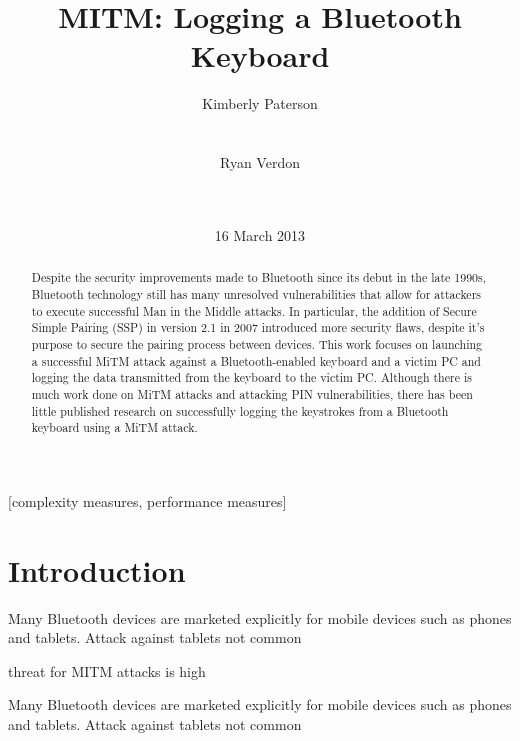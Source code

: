 \documentclass{acm_proc_article-sp}
\begin{document}
\title{MITM: Logging a Bluetooth Keyboard}
\author{
\alignauthor Kimberly Paterson\\
\\
\\
\alignauthor Ryan Verdon\\
\\
\\
}

\date{16 March 2013}
\maketitle

\begin{abstract}
Despite the security improvements made to Bluetooth since its debut in the late 1990s, Bluetooth technology still has many unresolved vulnerabilities that allow for attackers to execute successful Man in the Middle attacks. In particular, the addition of Secure Simple Pairing (SSP) in version 2.1 in 2007 introduced more security flaws, despite it's purpose to secure the pairing process between devices. This work focuses on launching a successful MiTM attack against a Bluetooth-enabled keyboard and a victim PC and logging the data transmitted from the keyboard to the victim PC. Although there is much work done on MiTM attacks and attacking PIN vulnerabilities, there has been little published research on successfully logging the keystrokes from a Bluetooth keyboard using a MiTM attack. 
\end{abstract}


[complexity measures, performance measures]


\section{Introduction}
Many Bluetooth devices are marketed explicitly for mobile devices such as phones and tablets. 
Attack against tablets not common

threat for MITM attacks is high \cite{sandhya2012analysis}


Many Bluetooth devices are marketed explicitly for mobile devices such as phones and tablets. 
Attack against tablets not common
\end{document}

